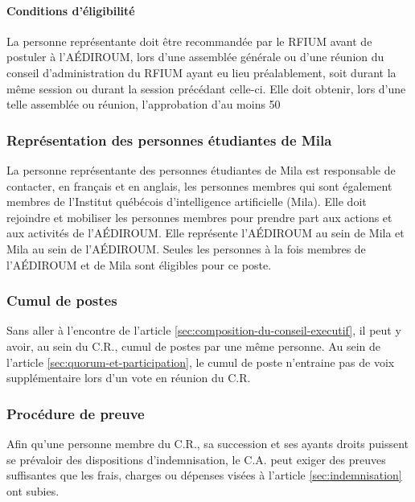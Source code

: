 \documentclass{aediroum}
\newcommand{\article}[1]{article \ref{#1}}
\begin{document}
\paragraph{Conditions d'éligibilité}

La personne représentante doit être recommandée par le
RFIUM avant de postuler à l’AÉDIROUM, lors d’une assemblée générale ou d’une réunion du conseil d’administration du RFIUM ayant eu lieu préalablement, soit durant la même session ou durant la session précédant celle-ci. Elle doit obtenir, lors d’une telle
assemblée ou réunion, l’approbation d’au moins 50%

\subsubsection{Représentation des personnes
étudiantes de Mila}
La personne représentante des personnes étudiantes de Mila est responsable de contacter,
en français et en anglais, les personnes membres qui sont également membres de
l’Institut québécois d’intelligence artificielle (Mila). Elle doit rejoindre et mobiliser les
personnes membres pour prendre part aux actions et aux activités de l’AÉDIROUM. Elle
représente l’AÉDIROUM au sein de Mila et Mila au sein de l’AÉDIROUM. Seules les
personnes à la fois membres de l’AÉDIROUM et de Mila sont éligibles pour ce poste.

\subsubsection{Cumul de postes}\label{sec:cumul-de-postes}

Sans aller à l'encontre de l'\article{sec:composition-du-conseil-executif}, il peut y avoir, au sein du C.R., cumul de postes par une même personne. Au sein de l'\article{sec:quorum-et-participation}, le cumul de poste n'entraine pas de voix supplémentaire lors d'un vote en réunion du C.R.

\subsubsection{Procédure de preuve}\label{sec:procedure-de-preuve}

Afin qu'une personne membre du C.R., sa succession et ses ayants droits puissent se prévaloir des dispositions d'indemnisation, le C.A. peut exiger des preuves suffisantes que les frais, charges ou dépenses visées à l'\article{sec:indemnisation} ont subies.
\end{document}
